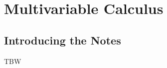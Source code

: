 \documentclass[../../main.tex]{subfiles}
\begin{document}
\part{Multivariable Calculus}\label{part:MATH03}
\localtableofcontents

\chapter*{Introducing the Notes}

TBW

\cite{MATH03-1}
\cite{MATH03-2}



















\end{document}
